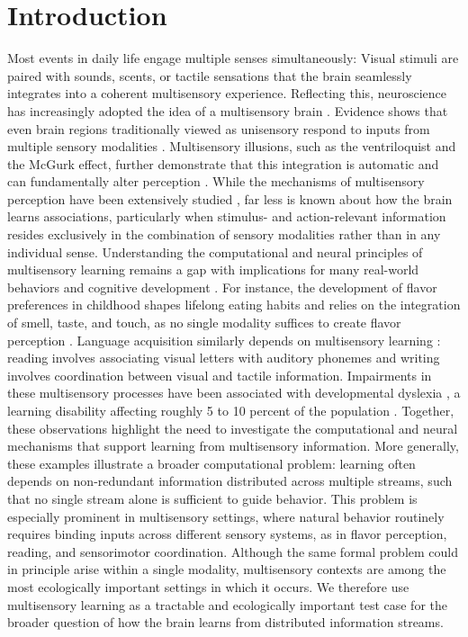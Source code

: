 \documentclass{article}
\begin{document}
\section*{Introduction}

Most events in daily life engage multiple senses simultaneously: Visual stimuli are paired with sounds, scents, or tactile sensations that the brain seamlessly integrates into a coherent multisensory experience. Reflecting this, neuroscience has increasingly adopted the idea of a multisensory brain \cite{calvert2004handbook, SHIMOJO2001505, ghazanfar2006neocortex, nava2023emergence, zheng2024multisensory}. Evidence shows that even brain regions traditionally viewed as unisensory respond to inputs from multiple sensory modalities \cite{driver2008multisensory}. Multisensory illusions, such as the ventriloquist and the McGurk effect, further demonstrate that this integration is automatic and can fundamentally alter perception \cite{vroomen2004handbook}. While the mechanisms of multisensory perception have been extensively studied \cite{stein2008multisensory, murray2011neural}, far less is known about how the brain learns associations, particularly when stimulus- and action-relevant information resides exclusively in the combination of sensory modalities rather than in any individual sense. Understanding the computational and neural principles of multisensory learning remains a gap with implications for many real-world behaviors and cognitive development \cite{denervaud_multisensory_2020, dionne-dostie_multisensory_2015}. For instance, the development of flavor preferences in childhood shapes lifelong eating habits \cite{beauchamp2009early} and relies on the integration of smell, taste, and touch, as no single modality suffices to create flavor perception \cite{auvray2008multisensory, spence2015multisensory}. Language acquisition similarly depends on multisensory learning \cite{dionne-dostie_multisensory_2015}: reading involves associating visual letters with auditory phonemes and writing involves coordination between visual and tactile information. Impairments in these multisensory processes have been associated with developmental dyslexia \cite{frei2025toward, hahn2014impairments}, a learning disability affecting roughly 5 to 10 percent of the population \cite{shaywitz1990prevalence}. Together, these observations highlight the need to investigate the computational and neural mechanisms that support learning from multisensory information. More generally, these examples illustrate a broader computational problem: learning often depends on non-redundant information distributed across multiple streams, such that no single stream alone is sufficient to guide behavior. This problem is especially prominent in multisensory settings, where natural behavior routinely requires binding inputs across different sensory systems, as in flavor perception, reading, and sensorimotor coordination. Although the same formal problem could in principle arise within a single modality, multisensory contexts are among the most ecologically important settings in which it occurs. We therefore use multisensory learning as a tractable and ecologically important test case for the broader question of how the brain learns from distributed information streams.\newline
\end{document}
